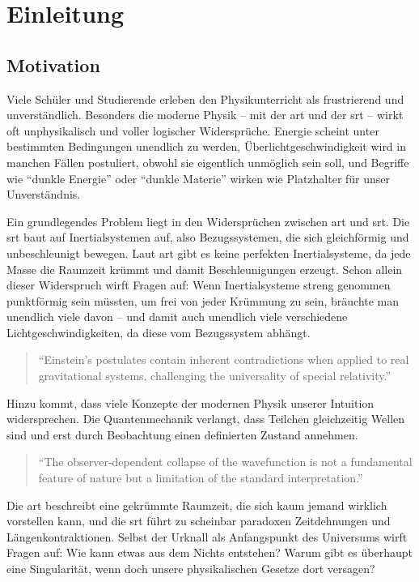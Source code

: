 \chapter{Einleitung}
\section{Motivation}
Viele Schüler und Studierende erleben den Physikunterricht als frustrierend und unverständlich. Besonders die moderne Physik – mit der \gls{art}
und der \gls{srt} – wirkt oft unphysikalisch und voller logischer Widersprüche. Energie scheint unter bestimmten Bedingungen unendlich zu werden,
Überlichtgeschwindigkeit wird in manchen Fällen postuliert, obwohl sie eigentlich unmöglich sein soll, und Begriffe wie \enquote{dunkle Energie} oder \enquote{dunkle Materie} wirken wie
Platzhalter für unser Unverständnis.

Ein grundlegendes Problem liegt in den Widersprüchen zwischen \gls{art} und \gls{srt}. Die \gls{srt} baut auf Inertialsystemen auf, also Bezugssystemen, die sich gleichförmig und unbeschleunigt
bewegen. Laut \gls{art} gibt es keine perfekten Inertialsysteme, da jede Masse die Raumzeit krümmt und damit Beschleunigungen erzeugt. Schon allein dieser Widerspruch wirft
Fragen auf: Wenn Inertialsysteme streng genommen punktförmig sein müssten, um frei von jeder Krümmung zu sein, bräuchte man unendlich viele davon – und damit auch unendlich
viele verschiedene Lichtgeschwindigkeiten, da diese vom Bezugssystem abhängt.
\begin{quote}
    \enquote{Einstein's postulates contain inherent contradictions when applied to real gravitational systems, challenging the universality of special relativity.} \cite{Rubcic1998}
\end{quote}
Hinzu kommt, dass viele Konzepte der modernen Physik unserer Intuition widersprechen. Die Quantenmechanik verlangt, dass Teilchen gleichzeitig Wellen sind und erst durch
Beobachtung einen definierten Zustand annehmen.
\begin{quote}
    \enquote{The observer-dependent collapse of the wavefunction is not a fundamental feature of nature but a limitation of the standard interpretation.} \cite{bohm1952}
\end{quote}
Die \gls{art} beschreibt eine gekrümmte Raumzeit, die sich kaum jemand wirklich vorstellen kann, und die \gls{srt} führt zu scheinbar
paradoxen Zeitdehnungen und Längenkontraktionen. Selbst der Urknall als Anfangspunkt des Universums wirft Fragen auf: Wie kann etwas aus dem Nichts entstehen? Warum gibt es
überhaupt eine Singularität, wenn doch unsere physikalischen Gesetze dort versagen?

